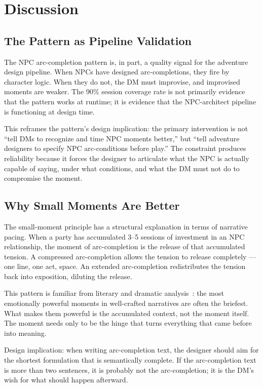 
\section{Discussion}
\label{sec:discussion}

\subsection{The Pattern as Pipeline Validation}

The NPC arc-completion pattern is, in part, a quality signal for the adventure design
pipeline. When NPCs have designed arc-completions, they fire by character logic. When
they do not, the DM must improvise, and improvised moments are weaker. The 90\% session
coverage rate is not primarily evidence that the pattern works at runtime; it is evidence
that the NPC-architect pipeline is functioning at design time.

This reframes the pattern's design implication: the primary intervention is not
``tell DMs to recognize and time NPC moments better,'' but ``tell adventure designers
to specify NPC arc-conditions before play.'' The constraint produces reliability
because it forces the designer to articulate what the NPC is actually capable of saying,
under what conditions, and what the DM must not do to compromise the moment.

\subsection{Why Small Moments Are Better}

The small-moment principle has a structural explanation in terms of narrative pacing.
When a party has accumulated 3--5 sessions of investment in an NPC relationship,
the moment of arc-completion is the release of that accumulated tension. A compressed
arc-completion allows the tension to release completely --- one line, one act, space.
An extended arc-completion redistributes the tension back into exposition, diluting
the release.

This pattern is familiar from literary and dramatic analysis~\cite{chekhov1886letter,
aristotle_poetics}: the most emotionally powerful moments in well-crafted narratives
are often the briefest. What makes them powerful is the accumulated context, not the
moment itself. The moment needs only to be the hinge that turns everything that came
before into meaning.

Design implication: when writing arc-completion text, the designer should aim for the
shortest formulation that is semantically complete. If the arc-completion text is more
than two sentences, it is probably not the arc-completion; it is the DM's wish for
what should happen afterward.


